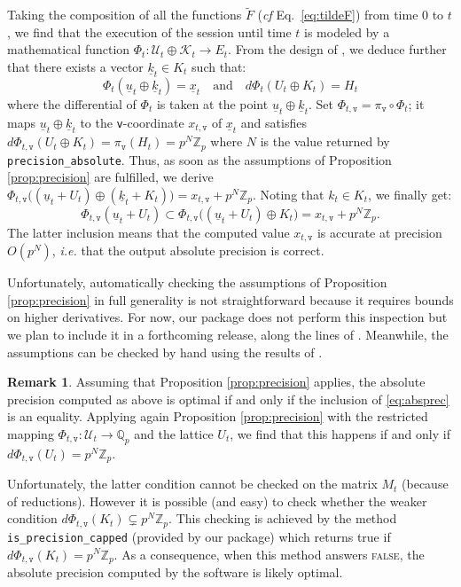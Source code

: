 \documentclass[sigconf]{acmart}
\newcommand{\Z}{\mathbb Z}
\newcommand{\Zp}{\Z_p}
\newcommand{\Q}{\mathbb Q}
\newcommand{\Qp}{\Q_p}
\newcommand{\ttv}{\texttt{v}\xspace}
\newcommand{\calU}{\mathcal{U}}
\newcommand{\calK}{\mathcal{K}}
\newcommand{\ZpLC}{\text{\color{output} \rm \tt ZpLC}\xspace}
\theoremstyle{definition}
\newtheorem{rmk}[theo]{Remark}
\begin{document}
Taking the composition of all the functions $\tilde F$ (\emph{cf} 
Eq.~\eqref{eq:tildeF}) from time $0$ to $t$, we find that the execution 
of the session until time $t$ is modeled by a mathematical function
$\Phi_t : \calU_t \oplus \calK_t \to E_t$.
From the design of \ZpLC, we deduce further that there exists a 
vector $\underline k_t \in K_t$ such that:
$$\Phi_t(\underline u_t \oplus \underline k_t) = \underline x_t 
\quad \text{and} \quad
d\Phi_t (U_t \oplus K_t) = H_t$$
where the differential of $\Phi_t$ is taken at the point
$\underline u_t \oplus \underline k_t$. 
Set $\Phi_{t,\ttv} = \pi_\ttv \circ \Phi_t$; it maps 
$\underline u_t \oplus \underline k_t$ to the \ttv-coordinate 
$x_{t,\ttv}$ of $\underline x_t$ and satisfies
$d\Phi_{t,\ttv} (U_t \oplus K_t) = \pi_\ttv(H_t) = p^N \Zp$
where $N$ is the value returned by {\color{method}\verb?precision_absolute?}. Thus, 
as soon as the assumptions of Proposition \ref{prop:precision} are
fulfilled, we derive
$\Phi_{t,\ttv} \big((\underline u_t + U_t) \oplus (\underline k_t + K_t)\big) = 
x_{t,\ttv} + p^N \Zp$.
Noting that $k_t \in K_t$, we finally get:
\begin{equation}
\label{eq:absprec}
\Phi_{t,\ttv} (\underline u_t + U_t) \subset
\Phi_{t,\ttv} \big((\underline u_t + U_t) \oplus K_t\big) = 
x_{t,\ttv} + p^N \Zp.
\end{equation}
The latter inclusion means that the computed value $x_{t,\ttv}$ is
accurate at precision $O(p^N)$, \emph{i.e.} that the output absolute
precision is correct. 

Unfortunately, automatically checking the assumptions of Proposition 
\ref{prop:precision} in full generality is not straightforward because 
it requires bounds on higher derivatives. For now, our package does not 
perform this inspection but we plan to include it in a forthcoming 
release, along the lines of 
\cite[Proposition~3.12]{caruso-roe-vaccon:14a}. 
Meanwhile, the assumptions can be checked by hand using the results
of \cite{caruso-roe-vaccon:14a, caruso:2017, LV16}.

\begin{rmk} \label{rmk:cap_optimality}
Assuming that Proposition \ref{prop:precision} applies, 
the absolute precision computed as above is optimal if and only if
the inclusion of \eqref{eq:absprec} is an equality. Applying again
Proposition \ref{prop:precision}
with the restricted mapping $\Phi_{t,\ttv} : \calU_t \to \Qp$ and the
lattice $U_t$, we find that this happens if and only if
$d\Phi_{t,\ttv}(U_t) = p^N \Zp$.

Unfortunately, the latter condition cannot be checked on the matrix 
$M_t$ (because of reductions). 
However it is possible (and easy) to check whether the weaker condition 
$d\Phi_{t,\ttv}(K_t) \subsetneq p^N \Zp$. This checking is achieved by 
the method
{\color{method}\verb?is_precision_capped?} (provided by our package) which returns true 
if $d\Phi_{t,\ttv}(K_t) = p^N \Zp$. As a consequence, when this method
answers \textsc{false}, the absolute precision computed by the software 
is likely optimal.
\end{rmk}
\end{document}
